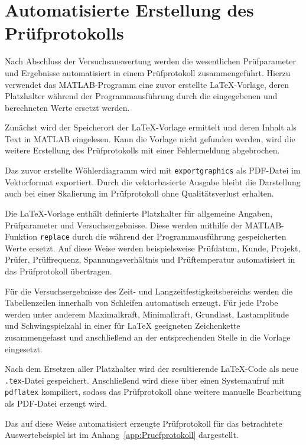 	\section{Automatisierte Erstellung des Prüfprotokolls}
Nach Abschluss der Versuchsauswertung werden die wesentlichen Prüfparameter und Ergebnisse automatisiert in einem Prüfprotokoll zusammengeführt. Hierzu verwendet das MATLAB-Programm eine zuvor erstellte LaTeX-Vorlage, deren Platzhalter während der Programmausführung durch die eingegebenen und berechneten Werte ersetzt werden.

Zunächst wird der Speicherort der LaTeX-Vorlage ermittelt und deren Inhalt als Text in MATLAB eingelesen. Kann die Vorlage nicht gefunden werden, wird die weitere Erstellung des Prüfprotokolls mit einer Fehlermeldung abgebrochen.

Das zuvor erstellte Wöhlerdiagramm wird mit \texttt{exportgraphics} als PDF-Datei im Vektorformat exportiert. Durch die vektorbasierte Ausgabe bleibt die Darstellung auch bei einer Skalierung im Prüfprotokoll ohne Qualitätsverlust erhalten.

Die LaTeX-Vorlage enthält definierte Platzhalter für allgemeine Angaben, Prüfparameter und Versuchsergebnisse. Diese werden mithilfe der MATLAB-Funktion \texttt{replace} durch die während der Programmausführung gespeicherten Werte ersetzt. Auf diese Weise werden beispielsweise Prüfdatum, Kunde, Projekt, Prüfer, Prüffrequenz, Spannungsverhältnis und Prüftemperatur automatisiert in das Prüfprotokoll übertragen.

Für die Versuchsergebnisse des Zeit- und Langzeitfestigkeitsbereichs werden die Tabellenzeilen innerhalb von Schleifen automatisch erzeugt. Für jede Probe werden unter anderem Maximalkraft, Minimalkraft, Grundlast, Lastamplitude und Schwingspielzahl in einer für LaTeX geeigneten Zeichenkette zusammengefasst und anschließend an der entsprechenden Stelle in die Vorlage eingesetzt.

Nach dem Ersetzen aller Platzhalter wird der resultierende LaTeX-Code als neue \texttt{.tex}-Datei gespeichert. Anschließend wird diese über einen Systemaufruf mit \texttt{pdflatex} kompiliert, sodass das Prüfprotokoll ohne weitere manuelle Bearbeitung als PDF-Datei erzeugt wird.

Das auf diese Weise automatisiert erzeugte Prüfprotokoll für das betrachtete Auswertebeispiel ist im Anhang~\ref{app:Pruefprotokoll} dargestellt.